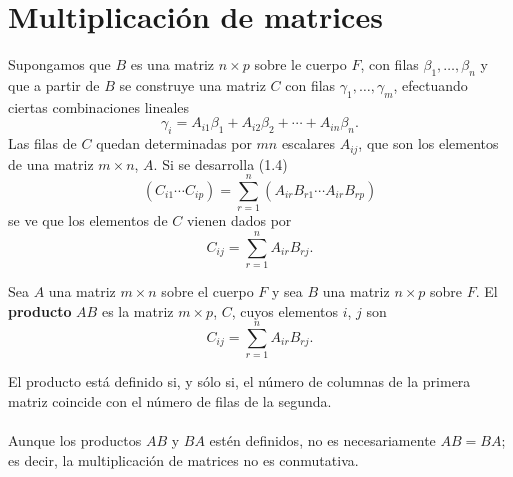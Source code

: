 \begin{enumerate}[\bfseries 1.]
\end{enumerate}


\section{Multiplicación de matrices}
Supongamos que $B$ es una matriz $n\times p$ sobre le cuerpo $F$, con filas $\beta_1,\ldots , \beta_n$ y que a partir de $B$ se construye una matriz $C$ con filas $\gamma_1,\ldots , \gamma_m$, efectuando ciertas combinaciones lineales
\begin{equation}
    \gamma_i = A_{i1}\beta_1+A_{i2}\beta_2 + \cdots + A_{in}\beta_n.
\end{equation}
Las filas de $C$ quedan determinadas por $mn$ escalares $A_{ij}$, que son los elementos de una matriz $m\times n$, $A$. Si se desarrolla (1.4)
$$\left(C_{i1}\cdots C_{ip}\right)=\sum_{r=1}^n \left(A_{ir}B_{r1} \cdots A_{ir}B_{rp}\right)$$
se ve que los elementos de $C$ vienen dados por
$$C_{ij}=\sum_{r=1}^n A_{ir}B_{rj}.$$

\begin{def.}
    Sea $A$ una matriz $m\times n$ sobre el cuerpo $F$ y sea $B$ una matriz $n\times p$ sobre $F$. El \textbf{producto} $AB$ es la matriz $m\times p$, $C$, cuyos elementos $i$, $j$ son
    $$C_{ij} = \sum_{r=1}^n A_{ir}B_{rj}.$$
\end{def.}

El producto está definido si, y sólo si, el número de columnas de la primera matriz coincide con el número de filas de la segunda. \\\\
Aunque los productos $AB$ y $BA$ estén definidos, no es necesariamente $AB=BA$; es decir, la multiplicación de matrices no es conmutativa.

